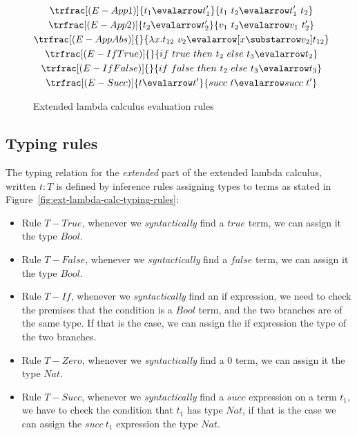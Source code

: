 \begin{figure}[H]
       \[
              \begin{gathered}
                     \trfrac[(E-App1)]{t_1 \evalarrow t_1'}{t_1\ t_2 \evalarrow t_1'\ t_2} \\
                     \trfrac[(E-App2)]{t_2 \evalarrow t_2'}{v_1\ t_2 \evalarrow v_1\ t_2'} \\
                     \trfrac[(E-AppAbs)]{}{\lambda x.t_{12}\ v_2 \evalarrow [x \substarrow v_2]t_{12}} \\
                     \trfrac[(E-IfTrue)]{}{if\ true\ then\ t_2\ else\ t_3 \evalarrow t_2} \\
                     \trfrac[(E-IfFalse)]{}{if\ false\ then\ t_2\ else\ t_3 \evalarrow t_3} \\
                     \trfrac[(E-Succ)]{t \evalarrow t'}{succ\ t \evalarrow succ\ t'} \\
              \end{gathered}
       \]
       \caption{Extended lambda calculus evaluation rules}\label{fig:ext-lambda-calc-eval-rules}
\end{figure}

\subsection{Typing rules}

The typing relation for the \emph{extended} part of the extended lambda calculus, written $t : T$ is defined by inference rules assigning types to terms as stated in Figure~\ref{fig:ext-lambda-calc-typing-rules}:
\begin{itemize}
       \item Rule $T-True$, whenever we \emph{syntactically} find a $true$ term, we can assign it the type $Bool$.
       \item Rule $T-False$, whenever we \emph{syntactically} find a $false$ term, we can assign it the type $Bool$.
       \item Rule $T-If$, whenever we \emph{syntactically} find an if expression, we need to check the premises that the condition is a $Bool$ term, and the two branches are of the same type. If that is the case, we can assign the if expression the type of the two branches.
       \item Rule $T-Zero$, whenever we \emph{syntactically} find a $0$ term, we can assign it the type $Nat$.
       \item Rule $T-Succ$, whenever we \emph{syntactically} find a $succ$ expression on a term $t_1$, we have to check the condition that $t_1$ has type $Nat$, if that is the case we can assign the $succ\ t_1$ expression the type $Nat$.
\end{itemize}

